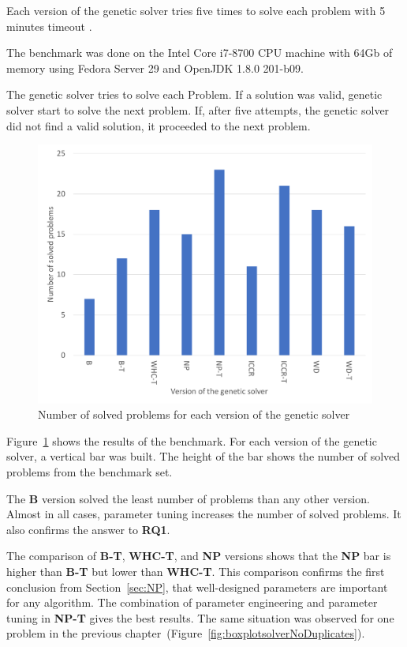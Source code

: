 Each version of the genetic solver tries five times to solve each problem with 5 minutes timeout .

The benchmark was done on the Intel Core i7-8700 CPU machine with 64Gb of memory using Fedora Server 29 and OpenJDK 1.8.0 201-b09.

The genetic solver tries to solve each Problem. If a solution was valid, genetic solver start to solve the next problem. If, after five attempts, the genetic solver did not find a valid solution, it proceeded to the next problem.

\begin{figure}
	\centering
	\includegraphics[width=\textwidth]{images/EvaluationNumberOfSolvedProblems.pdf}
	\caption[Number of problems for each version of the genetic solver]{Number of solved problems for each version of the genetic solver}
	\label{fig:EvaluationNumberOfSolvedProblems}
\end{figure}

Figure~\ref{fig:EvaluationNumberOfSolvedProblems} shows the results of the benchmark. For each version of the genetic solver, a vertical bar was built. The height of the bar shows the number of solved problems from the benchmark set. 

The \textbf{B} version solved the least number of problems than any other version. Almost in all cases, parameter tuning increases the number of solved problems. It also confirms the answer to \textbf{RQ1}. 

The comparison of \textbf{B-T}, \textbf{WHC-T}, and \textbf{NP} versions shows that the \textbf{NP} bar is higher than \textbf{B-T} but lower than \textbf{WHC-T}. This comparison confirms the first conclusion from Section~\ref{sec:NP}, that well-designed parameters are important for any algorithm. The combination of parameter engineering and parameter tuning in \textbf{NP-T} gives the best results. The same situation was observed for one problem in the previous chapter~(Figure~\ref{fig:boxplotsolverNoDuplicates}). 

